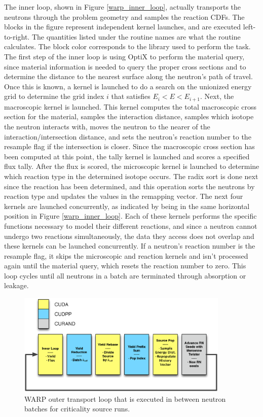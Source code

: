 The inner loop, shown in Figure \ref{warp_inner_loop}, actually transports the neutrons through the problem geometry and samples the reaction CDFs.  The blocks in the figure represent independent kernel launches, and are executed left-to-right.  The quantities listed under the routine names are what the routine calculates.  The block color corresponds to the library used to perform the task.  The first step of the inner loop is using OptiX to perform the material query, since material information is needed to query the proper cross sections and to determine the distance to the nearest surface along the neutron's path of travel.  Once this is known, a kernel is launched to do a search on the unionized energy grid to determine the grid index $i$ that satisfies $E_i<E<E_{i+1}$.  Next, the macroscopic kernel is launched. This kernel computes the total macroscopic cross section for the material, samples the interaction distance, samples which isotope the neutron interacts with, moves the neutron to the nearer of the interaction/intersection distance, and sets the neutron's reaction number to the resample flag if the intersection is closer.   Since the macroscopic cross section has been computed at this point, the tally kernel is launched and scores a specified flux tally.  After the flux is scored, the microscopic kernel is launched to determine which reaction type in the determined isotope occurs.  The radix sort is done next since the reaction has been determined, and this operation sorts the neutrons by reaction type and updates the values in the remapping vector.  The next four kernels are launched concurrently, as indicated by being in the same horizontal position in Figure \ref{warp_inner_loop}.  Each of these kernels performs the specific functions necessary to model their different reactions, and since a neutron cannot undergo two reactions simultaneously, the data they access does not overlap and these kernels can be launched concurrently.  If a neutron's reaction number is the resample flag, it skips the microscopic and reaction kernels and isn't processed again until the material query, which resets the reaction number to zero.   This loop cycles until all neutrons in a batch are terminated through absorption or leakage.  

 \begin{figure}[h!] 
\centering
\includegraphics[width=0.9\textwidth]{graphics/warp_outer_loop.eps}
\caption{WARP outer transport loop that is executed in between neutron batches for criticality source runs. \label{warp_outer_loop} }
\end{figure} %


